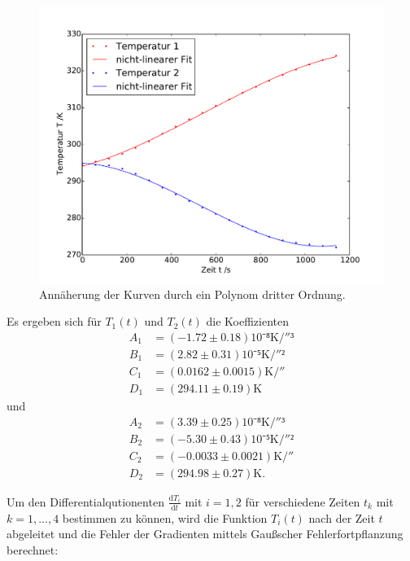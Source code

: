\begin{figure}
\includegraphics[width=\textwidth]{Bilder/Temperaturfit.pdf}
	\caption{Annäherung der Kurven durch ein Polynom dritter Ordnung.}
\end{figure}
\newpage
Es ergeben sich für $T_1(t)$ und $T_2(t)$ die Koeffizienten 
\begin{equation}
\begin{split}
A_1&=(-1.72\pm0.18)10⁻⁸\si{\kelvin\per{\second}³}\\
B_1&=(2.82\pm0.31)10⁻⁵\si{\kelvin\per{\second}²}\\
C_1&=(0.0162\pm0.0015)\si{\kelvin\per{\second}}\\
D_1&=(294.11\pm0.19)\si{\kelvin}
\end{split}
\end{equation}
und
\begin{equation}
\begin{split}
A_2&=(3.39\pm0.25)10⁻⁸\si{\kelvin\per{\second}³}\\
B_2&=(-5.30\pm0.43)10⁻⁵\si{\kelvin\per{\second}²}\\
C_2&=(-0.0033\pm0.0021)\si{\kelvin\per{\second}}\\
D_2&=(294.98\pm0.27)\si{\kelvin}.
\end{split}
\end{equation}

Um den Differentialqutionenten $\frac{\mathup{d}T_i}{\mathup{d}t}$ mit $i=1,2$ für verschiedene Zeiten $t_k$ mit $k=1,...,4$ bestimmen zu können, wird die Funktion $T_i(t)$ nach der Zeit $t$ abgeleitet und die Fehler der Gradienten mittels Gaußscher Fehlerfortpflanzung berechnet:

